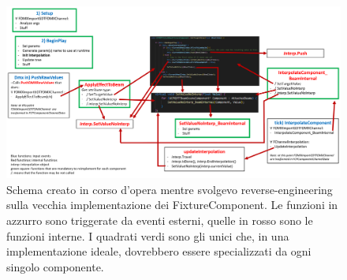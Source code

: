 \documentclass[main.tex]{subfiles}
\begin{document}
\begin{figure}[H]
    \centering
    \includegraphics[width=1\linewidth]{img/fixtureComponent/CallOrderScheme.png}
    \caption{Schema creato in corso d'opera mentre svolgevo reverse-engineering sulla vecchia implementazione dei FixtureComponent. Le funzioni in azzurro sono triggerate da eventi esterni, quelle in rosso sono le funzioni interne. I quadrati verdi sono gli unici che, in una implementazione ideale, dovrebbero essere specializzati da ogni singolo componente.}
    \label{fig:3_CallOrderOld}
\end{figure}
\end{document}
